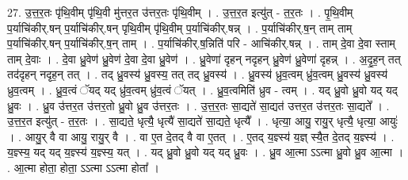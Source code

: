 \documentclass[17pt]{extarticle}
\begin{document}
27. उ॒त्त॒र॒तः पृ॑थि॒वीम् पृ॑थि॒वी मु॑त्तर॒त उ॑त्तर॒तः पृ॑थि॒वीम् । . उ॒त्त॒र॒त इत्यु॑त् - त॒र॒तः । . पृ॒थि॒वीम् प॒र्याचि॑कीर्.षन् प॒र्याचि॑कीर्.षन् पृथि॒वीम् पृ॑थि॒वीम् प॒र्याचि॑कीर्.षन्न् । . प॒र्याचि॑कीर्.ष॒न् ताम् ताम् प॒र्याचि॑कीर्.षन् प॒र्याचि॑कीर्.ष॒न् ताम् । . प॒र्याचि॑कीर्.ष॒न्निति॑ परि - आचि॑कीर्.षन्न् । . ताम् दे॒वा दे॒वा स्ताम् ताम् दे॒वाः । . दे॒वा ध्रु॒वेण॑ ध्रु॒वेण॑ दे॒वा दे॒वा ध्रु॒वेण॑ । . ध्रु॒वेणा॑ दृहन् नदृहन् ध्रु॒वेण॑ ध्रु॒वेणा॑ दृहन्न् । . अ॒दृ॒ह॒न् तत् तद॑दृहन् नदृह॒न् तत् । . तद् ध्रु॒वस्य॑ ध्रु॒वस्य॒ तत् तद् ध्रु॒वस्य॑ । . ध्रु॒वस्य॑ ध्रुव॒त्वम् ध्रु॑व॒त्वम् ध्रु॒वस्य॑ ध्रु॒वस्य॑ ध्रुव॒त्वम् । . ध्रु॒व॒त्वं ॅयद् यद् ध्रु॑व॒त्वम् ध्रु॑व॒त्वं ॅयत् । . ध्रु॒व॒त्वमिति॑ ध्रुव - त्वम् । . यद् ध्रु॒वो ध्रु॒वो यद् यद् ध्रु॒वः । . ध्रु॒व उ॑त्तर॒त उ॑त्तर॒तो ध्रु॒वो ध्रु॒व उ॑त्तर॒तः । . उ॒त्त॒र॒तः सा॒द्यते॑ सा॒द्यत॑ उत्तर॒त उ॑त्तर॒तः सा॒द्यते᳚ । . उ॒त्त॒र॒त इत्यु॑त् - त॒र॒तः । . सा॒द्यते॒ धृत्यै॒ धृत्यै॑ सा॒द्यते॑ सा॒द्यते॒ धृत्यै᳚ । . धृत्या॒ आयु॒ रायु॒र् धृत्यै॒ धृत्या॒ आयुः॑ । . आयु॒र् वै वा आयु॒ रायु॒र् वै । . वा ए॒त दे॒तद् वै वा ए॒तत् । . ए॒तद् य॒ज्ञ्स्य॑ य॒ज्ञ् स्यै॒त दे॒तद् य॒ज्ञ्स्य॑ । . य॒ज्ञ्स्य॒ यद् यद् य॒ज्ञ्स्य॑ य॒ज्ञ्स्य॒ यत् । . यद् ध्रु॒वो ध्रु॒वो यद् यद् ध्रु॒वः । . ध्रु॒व आ॒त्मा ऽऽत्मा ध्रु॒वो ध्रु॒व आ॒त्मा । . आ॒त्मा होता॒ होता॒ ऽऽत्मा ऽऽत्मा होता᳚ । \newline
\end{document}
